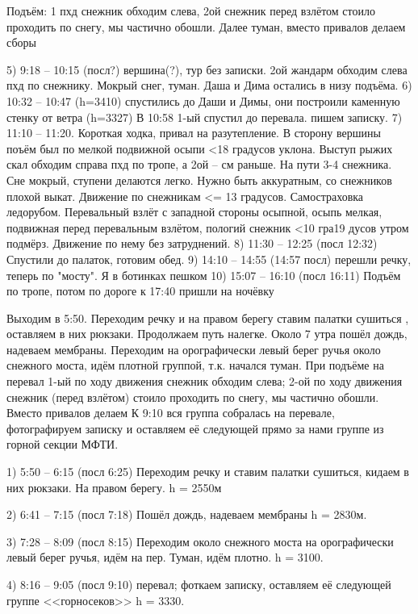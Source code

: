 Подъём: 1 пхд снежник обходим слева, 2ой снежник перед взлётом стоило проходить по снегу, мы частично обошли. Далее туман, вместо привалов делаем сборы


5) 9:18 – 10:15 (посл?) вершина(?), тур без записки. 2ой жандарм обходим слева
пхд по снежнику. Мокрый снег, туман. Даша и Дима остались в низу подъёма.
6) 10:32 – 10:47 (h=3410) спустились до Даши и Димы, они построили каменную стенку от ветра (h=3327) В 10:58 1-ый спустил до перевала. пишем записку.
7) 11:10 – 11:20. Короткая ходка, привал на разутепление.
В сторону вершины поъём был по мелкой подвижной осыпи <18 градусов
уклона. Выступ рыжих скал обходим справа пхд по тропе, а 2ой – см раньше.
На пути 3-4 снежника. Сне мокрый, ступени делаются легко. Нужно быть
аккуратным, со снежников плохой выкат. Движение по снежникам <= 13 градусов. Самостраховка ледорубом. Перевальный взлёт с западной стороны осыпной,
осыпь мелкая, подвижная перед перевальным взлётом, пологий снежник <10 гра19
дусов утром подмёрз. Движение по нему без затруднений.
8) 11:30 – 12:25 (посл 12:32) Спустили до палаток, готовим обед.
9) 14:10 – 14:55 (14:57 посл) перешли речку, теперь по "мосту". Я в ботинках
пешком
10) 15:07 – 16:10 (посл 16:11) Подъём по тропе, потом по дороге
к 17:40 пришли на ночёвку

Выходим в 5:50. Переходим речку и на правом берегу ставим палатки сушиться , оставляем в них рюкзаки. Продолжаем путь налегке. Около 7 утра пошёл дождь, надеваем мембраны. Переходим на орографически левый берег ручья около снежного моста, идём плотной группой, т.к. начался туман.
При подъёме на перевал 1-ый по ходу движения снежник обходим слева; 2-ой по ходу движения снежник (перед взлётом) стоило проходить по снегу, мы частично обошли. Вместо привалов делаем К 9:10 вся группа собралась на перевале, фотографируем записку и оставляем её следующей прямо за нами группе из горной секции МФТИ.


1) 5:50 -- 6:15 (посл 6:25) Переходим речку и ставим палатки сушиться, кидаем в них рюкзаки. На правом берегу. h = 2550м

2) 6:41 -- 7:15 (посл 7:18) Пошёл дождь, надеваем мембраны h = 2830м.

3) 7:28 -- 8:09 (посл 8:15) Переходим около снежного моста на орографически левый берег ручья, идём на пер.  Туман, идём плотно. h = 3100.

4) 8:16 -- 9:05 (посл 9:10) перевал; фоткаем записку, оставляем её следующей группе <<горносеков>> h = 3330.


